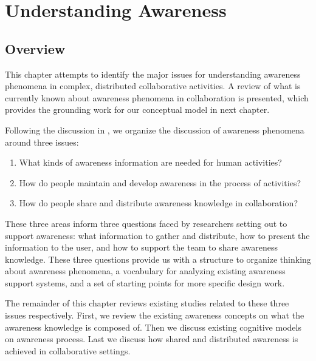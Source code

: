 \graphicspath{{Figures/}}
\chapter{Understanding Awareness} %
\label{cha:understanding_awareness}
\section{Overview} %
\label{sec:overview}
This chapter attempts to identify the major issues for understanding awareness phenomena in complex, distributed collaborative activities. A review of what is currently known about awareness phenomena in collaboration is presented, which provides the grounding work for our conceptual model in next chapter.

Following the discussion in \cite{Gutwin2002}, we organize the discussion of awareness phenomena around three issues:

\begin{enumerate}
   \item What kinds of awareness information are needed for human activities?
   \item How do people maintain and develop awareness in the process of activities?
   \item How do people share and distribute awareness knowledge in collaboration?
\end{enumerate}

These three areas inform three questions faced by researchers setting out to support awareness: what information to gather and distribute, how to present the information to the user, and how to support the team to share awareness knowledge. These three questions provide us with a structure to organize thinking about awareness phenomena, a vocabulary for analyzing existing awareness support systems, and a set of starting points for more specific design work.

The remainder of this chapter reviews existing studies related to these three issues respectively. First, we review the existing awareness concepts on what the awareness knowledge is composed of. Then we discuss existing cognitive models on awareness process. Last we discuss how shared and distributed awareness is achieved in collaborative settings.

